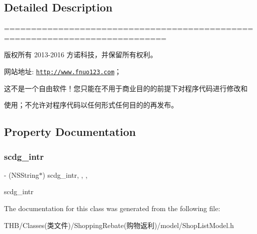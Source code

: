 \subsection{Detailed Description}
============================================================================

版权所有 2013-\/2016 方诺科技，并保留所有权利。

网站地址\+: \href{http://www.fnuo123.com}{\tt http\+://www.\+fnuo123.\+com}； 



这不是一个自由软件！您只能在不用于商业目的的前提下对程序代码进行修改和

使用；不允许对程序代码以任何形式任何目的的再发布。 

 

\subsection{Property Documentation}
\mbox{\label{interface_shop_list_model_a3335ef8bbdd7b8a9fbe6058ef09a3038}} 
\subsubsection{\texorpdfstring{scdg\+\_\+intr}{scdg\_intr}}
{\footnotesize\ttfamily -\/ (N\+S\+String$\ast$) scdg\+\_\+intr\hspace{0.3cm}{\ttfamily [read]}, {\ttfamily [write]}, {\ttfamily [nonatomic]}, {\ttfamily [copy]}}

scdg\+\_\+intr 

The documentation for this class was generated from the following file\+:\begin{DoxyCompactItemize}
\item 
T\+H\+B/\+Classes(类文件)/\+Shopping\+Rebate(购物返利)/model/Shop\+List\+Model.\+h\end{DoxyCompactItemize}
